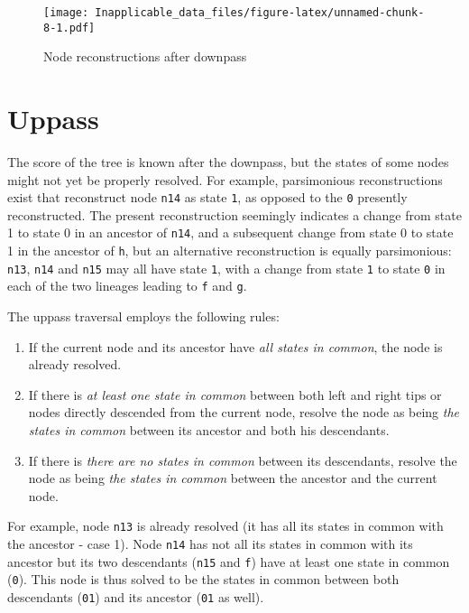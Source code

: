 \documentclass[]{book}
\providecommand{\tightlist}{%
  \setlength{\itemsep}{0pt}\setlength{\parskip}{0pt}}
\theoremstyle{definition}
\theoremstyle{definition}
\theoremstyle{definition}
\theoremstyle{remark}
\begin{document}
\begin{figure}
\centering
\texttt{[image: Inapplicable\_data\_files/figure-latex/unnamed-chunk-8-1.pdf]}
\caption{\label{fig:unnamed-chunk-8}Node reconstructions after downpass}
\end{figure}

\hypertarget{uppass}{%
\section{Uppass}\label{uppass}}

The score of the tree is known after the downpass, but the states of
some nodes might not yet be properly resolved. For example, parsimonious
reconstructions exist that reconstruct node \texttt{n14} as state
\texttt{1}, as opposed to the \texttt{0} presently reconstructed. The
present reconstruction seemingly indicates a change from state 1 to
state 0 in an ancestor of \texttt{n14}, and a subsequent change from
state 0 to state 1 in the ancestor of \texttt{h}, but an alternative
reconstruction is equally parsimonious: \texttt{n13}, \texttt{n14} and
\texttt{n15} may all have state \texttt{1}, with a change from state
\texttt{1} to state \texttt{0} in each of the two lineages leading to
\texttt{f} and \texttt{g}.

The uppass traversal employs the following rules:

\begin{enumerate}
\def\labelenumi{\arabic{enumi}.}
\tightlist
\item
  If the current node and its ancestor have \emph{all states in common},
  the node is already resolved.
\item
  If there is \emph{at least one state in common} between both left and
  right tips or nodes directly descended from the current node, resolve
  the node as being \emph{the states in common} between its ancestor and
  both his descendants.
\item
  If there is \emph{there are no states in common} between its
  descendants, resolve the node as being \emph{the states in common}
  between the ancestor and the current node.
\end{enumerate}

For example, node \texttt{n13} is already resolved (it has all its
states in common with the ancestor - case 1). Node \texttt{n14} has not
all its states in common with its ancestor but its two descendants
(\texttt{n15} and \texttt{f}) have at least one state in common
(\texttt{0}). This node is thus solved to be the states in common
between both descendants (\texttt{01}) and its ancestor (\texttt{01} as
well).
\end{document}
